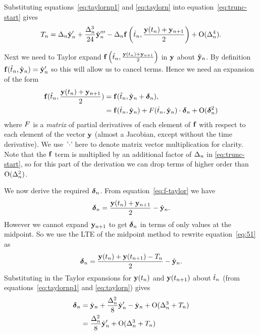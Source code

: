 Substituting equations~\eqref{eq:taylornp1} and \eqref{eq:taylorn} into equation~\eqref{eq:trunc-start} gives
\begin{equation}
  T_n = \Delta_{n} \hat{\mathbf{y}}_n' + \frac{\Delta_{n}^3}{24} \hat{\mathbf{y}}_n'''
  - \Delta_{n} {\mathbf{f}}\left( \hat{t}_n, \frac{\mathbf{y}(t_n) + \mathbf{y}_{n+1}}{2} \right)  + \text{O}(\Delta_{n}^4).
  \label{eq:trunc-mid}
\end{equation}

Next we need to Taylor expand ${\mathbf{f}}\left( \hat{t}_n, \frac{\mathbf{y}(t_n) + \mathbf{y}_{n+1}}{2} \right)$ in $\mathbf{y}$ about $\hat{\mathbf{y}}_n$.
By definition ${\mathbf{f}}(\hat{t}_n, \hat{\mathbf{y}}_n) = \hat{\mathbf{y}}_n'$ so this will allow us to cancel terms.
Hence we need an expansion of the form
\begin{align}
 {\mathbf{f}}(\hat{t}_n, \frac{\mathbf{y}(t_n) + \mathbf{y}_{n+1}}{2}) &= {\mathbf{f}}(\hat{t}_n, \hat{\mathbf{y}}_n + \mbox{\boldmath$\delta$}_{n}),
 \notag \\
 &= {\mathbf{f}}(\hat{t}_n, \hat{\mathbf{y}}_n) + F(\hat{t}_n, \hat{\mathbf{y}}_n) \cdot \mbox{\boldmath$\delta$}_{n}  + \text{O}(\mbox{\boldmath$\delta$}_{n}^2)
 \label{eq:f-taylor}
\end{align}
where $F$ is a \emph{matrix} of partial derivatives of each element of ${\mathbf{f}}$ with respect to each element of the vector $\mathbf{y}$ (\ie almost a Jacobian, except without the time derivative).
We use~'$\cdot$' here to denote matrix vector multiplication for clarity.
Note that the ${\mathbf{f}}$ term is multiplied by an additional factor of $\Delta_{n}$ in \eqref{eq:trunc-start}, so for this part of the derivation we can drop terms of higher order than $\text{O}(\Delta_{n}^2)$.

We now derive the required $\mbox{\boldmath$\delta$}_{n}$.
From equation~\eqref{eq:f-taylor} we have
\begin{equation}
  \mbox{\boldmath$\delta$}_{n} = \frac{\mathbf{y}(t_n) + \mathbf{y}_{n+1}}{2} - \hat{\mathbf{y}}_n.
  \label{eq:51}
\end{equation}
However we cannot expand $\mathbf{y}_{n+1}$ to get $\mbox{\boldmath$\delta$}_{n}$ in terms of only values at the midpoint.
So we use the LTE of the midpoint method to rewrite equation~\eqref{eq:51} as
\begin{equation}
   \mbox{\boldmath$\delta$}_{n} = \frac{\mathbf{y}(t_n) + \mathbf{y}(t_{n+1}) - T_n}{2} - \hat{\mathbf{y}}_n.
\end{equation}
Substituting in the Taylor expansions for $\mathbf{y}(t_n)$ and $\mathbf{y}(t_{n+1})$ about $\hat{t}_n$ (from equations~\eqref{eq:taylornp1} and \eqref{eq:taylorn}) gives
\begin{align}
  \mbox{\boldmath$\delta$}_{n} &= \hat{\mathbf{y}}_n + \frac{\Delta_{n}^2}{8} \hat{\mathbf{y}}_n' - \hat{\mathbf{y}}_n + \text{O}(\Delta_{n}^3+ T_n) \notag\\
  &= \frac{\Delta_{n}^2}{8} \hat{\mathbf{y}}_n' + \text{O}(\Delta_{n}^3 + T_n)
\end{align}

